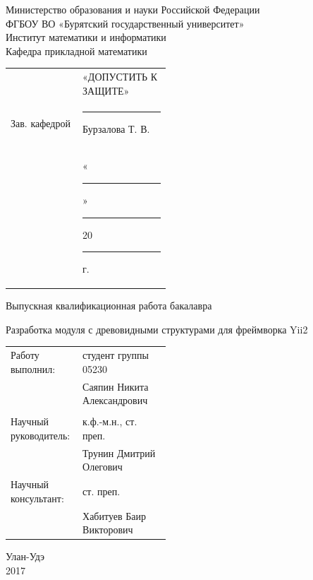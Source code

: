 \documentclass[a4paper,14pt]{extreport}
\theoremstyle{definition}
\renewcommand{\Large}{\fontsize{20}{25pt}\selectfont}
\begin{document}
\begin{titlepage}
\thispagestyle{empty}
\begin{center}
Министерство образования и науки Российской Федерации\\
ФГБОУ ВО «Бурятский государственный университет»\\
Институт математики и информатики\\
Кафедра прикладной математики
\end{center}

\vspace{3em}
\begin{table}[h!]
\begin{tabular}{p{0.45\linewidth}l}
\hfill  &«ДОПУСТИТЬ К ЗАЩИТЕ»\\
\hfill  Зав. кафедрой&\rule{3cm}{0.25pt}
 Бурзалова Т. В.\\
\hfill  &«\rule{1.5cm}{0.25pt}» \rule{3cm}{0.25pt} 20\rule{0.8cm}{0.25pt}г.
\end{tabular}
\end{table}

\vspace{2 cm}

\begin{center}
Выпускная квалификационная работа бакалавра
\end{center}

\begin{center}
\Large Разработка модуля с древовидными \linebreak  структурами для фреймворка Yii2 \linebreak
\end{center}

\begin{table}[h!]
\begin{tabular}{p{0.45\linewidth}l}
\hfill Работу выполнил:      & студент группы 05230 \\
                             & Саяпин Никита Александрович \\
                             \\

\hfill Научный руководитель: & к.ф.-м.н., ст. преп.  \\
                             & Трунин Дмитрий Олегович \\

\hfill Научный консультант: & ст. преп.  \\
                             &Хабитуев Баир Викторович \\



\end{tabular}
\end{table}

\vspace{\fill}

\begin{center}
Улан-Удэ \\ 2017
\end{center}

\end{titlepage}
\setcounter{page}{2}
\tableofcontents{}
\end{document}
